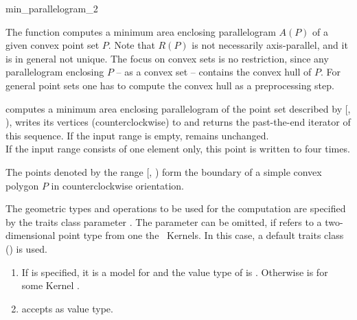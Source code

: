 \begin{ccRefFunction}{min_parallelogram_2}
  
  \ccDefinition The function computes a minimum area enclosing
  parallelogram $A(P)$ of a given convex point set $P$.  Note that
  $R(P)$ is not necessarily axis-parallel, and it is in general not
  unique. The focus on convex sets is no restriction, since any
  parallelogram enclosing $P$ -- as a convex set -- contains the convex
  hull of $P$. For general point sets one has to compute the convex hull
  as a preprocessing step.


  \def\ccLongParamLayout{\ccTrue} 
  
  
  computes a minimum area enclosing parallelogram of the point set
  described by [, ), writes its
  vertices (counterclockwise) to  and returns the past-the-end
  iterator of this sequence.
  If the input range is empty,  remains unchanged.\\
  If the input range consists of one element only, this point is written
  to  four times.
  
  \ccPrecond The points denoted by the range [,
  ) form the boundary of a simple convex polygon $P$
  in counterclockwise orientation.

  The geometric types and operations to be used for the computation
  are specified by the traits class parameter . The parameter can be
  omitted, if  refers to a two-dimensional point
  type from one the \cgal\ Kernels. In this case, a default traits class
  () is used.
  
  \ccRequire
  \begin{enumerate}
  \item If  is specified, it is a model for
     and the value type  of
     is . Otherwise
     is  for some Kernel
    .
  \item {} accepts  as value type.
  \end{enumerate}
  

\end{ccRefFunction}
